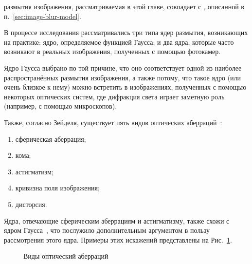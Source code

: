  размытия изображения, рассматриваемая в этой главе, совпадает с , описанной в п.~\ref{sec:image-blur-model}.

В процессе исследования рассматривались три типа ядер размытия, возникающих на практике: ядро, определяемое функцией Гаусса; и два ядра, которые часто возникают в реальных изображения, полученных с помощью фотокамер.

Ядро Гаусса выбрано по той причине, что оно соответствует одной из наиболее распространённых  размытия изображения, а также потому, что такое ядро (или очень близкое к нему) можно встретить в изображениях, полученных с помощью некоторых оптических систем, где дифракция света играет заметную роль (например, с помощью микроскопов).

Также, согласно  Зейделя, существует пять видов оптических аберраций~\cite{simpkins2014parameterized}:
\begin{enumerate}[beginpenalty=10000]
	\item сферическая аберрация;
	\item кома;
	\item астигматизм;
	\item кривизна поля изображения;
	\item дисторсия.
\end{enumerate}

Ядра, отвечающие сферическим аберрациям и астигматизму, также схожи с ядром Гаусса~\cite{simpkins2014parameterized, simpkins2011modeling}, что послужило дополнительным аргументом в пользу рассмотрения этого ядра. Примеры этих искажений представлены на Рис.~\ref{fig:warping-aberrations}.

\begin{figure}[ht]
	\caption{Виды оптический аберраций~\cite{simpkins2011modeling}}
	\label{fig:warping-aberrations}
\end{figure}

